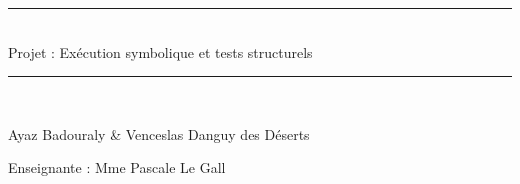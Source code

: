 \documentclass[a4paper, 12pt]{report}
\begin{document}
\begin{titlepage}
\newcommand{\HRule}{\rule{\linewidth}{0.5mm}}

\begin{center}

\HRule \\[0.4cm]
{ \huge Projet : Exécution symbolique et tests structurels}\\[0.4cm]
\HRule \\[2cm]

\vspace{2cm}

Ayaz Badouraly \& Venceslas Danguy des Déserts

\vspace{2cm}

Enseignante :
Mme Pascale Le Gall


\end{center}
\end{titlepage}



\tableofcontents
\newpage






\end{document}
